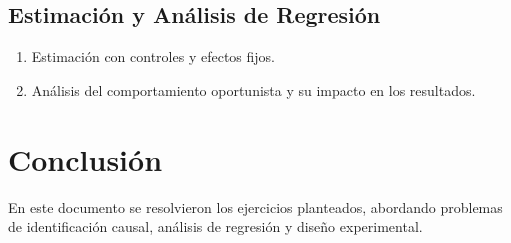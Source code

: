 \documentclass[12pt, letter]{article}
\begin{document}
\subsection{Estimación y Análisis de Regresión}
\begin{enumerate}[label=D.\arabic*]
    \item Estimación con controles y efectos fijos.
    \item Análisis del comportamiento oportunista y su impacto en los resultados.
\end{enumerate}

\section*{Conclusión}
\noindent En este documento se resolvieron los ejercicios planteados, abordando problemas de identificación causal, análisis de regresión y diseño experimental.
\end{document}
